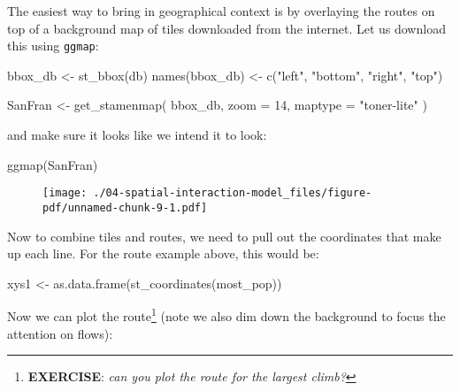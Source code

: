 \documentclass[
  letterpaper,
  krantz2]{style/krantz}
\newenvironment{Shaded}{\begin{snugshade}}{\end{snugshade}}
\newcommand{\AttributeTok}[1]{\textcolor[rgb]{0.40,0.45,0.13}{#1}}
\newcommand{\DecValTok}[1]{\textcolor[rgb]{0.68,0.00,0.00}{#1}}
\newcommand{\FunctionTok}[1]{\textcolor[rgb]{0.28,0.35,0.67}{#1}}
\newcommand{\NormalTok}[1]{\textcolor[rgb]{0.00,0.23,0.31}{#1}}
\newcommand{\OtherTok}[1]{\textcolor[rgb]{0.00,0.23,0.31}{#1}}
\newcommand{\StringTok}[1]{\textcolor[rgb]{0.13,0.47,0.30}{#1}}
\begin{document}
The easiest way to bring in geographical context is by overlaying the
routes on top of a background map of tiles downloaded from the internet.
Let us download this using \texttt{ggmap}:

\begin{Shaded}
\begin{Highlighting}[]
\NormalTok{bbox\_db }\OtherTok{\textless{}{-}} \FunctionTok{st\_bbox}\NormalTok{(db)}
\FunctionTok{names}\NormalTok{(bbox\_db) }\OtherTok{\textless{}{-}} \FunctionTok{c}\NormalTok{(}\StringTok{"left"}\NormalTok{, }\StringTok{"bottom"}\NormalTok{, }\StringTok{"right"}\NormalTok{, }\StringTok{"top"}\NormalTok{)}

\NormalTok{SanFran }\OtherTok{\textless{}{-}} \FunctionTok{get\_stamenmap}\NormalTok{(}
\NormalTok{  bbox\_db, }
  \AttributeTok{zoom =} \DecValTok{14}\NormalTok{, }
  \AttributeTok{maptype =} \StringTok{"toner{-}lite"}
\NormalTok{  )}
\end{Highlighting}
\end{Shaded}

and make sure it looks like we intend it to look:

\begin{Shaded}
\begin{Highlighting}[]
\FunctionTok{ggmap}\NormalTok{(SanFran)}
\end{Highlighting}
\end{Shaded}

\begin{figure}[H]

{\centering \texttt{[image: ./04-spatial-interaction-model\_files/figure-pdf/unnamed-chunk-9-1.pdf]}

}

\end{figure}

Now to combine tiles and routes, we need to pull out the coordinates
that make up each line. For the route example above, this would be:

\begin{Shaded}
\begin{Highlighting}[]
\NormalTok{xys1 }\OtherTok{\textless{}{-}} \FunctionTok{as.data.frame}\NormalTok{(}\FunctionTok{st\_coordinates}\NormalTok{(most\_pop))}
\end{Highlighting}
\end{Shaded}

Now we can plot the route\footnote{\textbf{EXERCISE}: \emph{can you plot
  the route for the largest climb?}} (note we also dim down the
background to focus the attention on flows):
\end{document}
